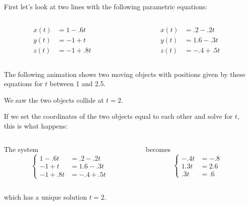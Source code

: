 \documentclass[aspectratio=169]{beamer}
\begin{document}
\begin{frame}
    First let's look at two lines with the following parametric equations:
    \vspace{1.5\baselineskip}
    \begin{columns}
        \begin{column}{0.5\textwidth}
            \[\begin{aligned}
                    x(t) &= 1 - .6t\\
                    y(t) &= -1 + t\\
                    z(t) &= -1 + .8t
                \end{aligned}\]
        \end{column}%
        \begin{column}{0.5\textwidth}
            \[\begin{aligned}
                    x(t) &= .2 - .2t\\
                    y(t) &= 1.6 - .3t\\
                    z(t) &= -.4 + .5t
                \end{aligned}\]
        \end{column}
    \end{columns}
    \pause
    \vspace{1.5\baselineskip}
    The following animation shows two moving objects with positions given by
    these equations for $t$ between 1 and 2.5.
\end{frame}
\begin{frame}
    We saw the two objects collide at $t=2$.\pause

    If we set the coordinates of the two objects equal to each other and solve
    for $t$, this is what happens:\pause

    \begin{columns}
        \begin{column}{.5\textwidth}
            The system
            \[
                \left\{
                    \begin{aligned}
                        1 - .6t &= .2 - .2t\\
                        -1 + t &= 1.6 - .3t\\
                        -1 + .8t &= -.4 + .5t
                    \end{aligned}
                \right.
            \]
        \end{column}\pause%
        \begin{column}{.5\textwidth}
            becomes
            \[
                \left\{
                    \begin{aligned}
                        -.4t &= -.8\\
                        1.3t &= 2.6\\
                        .3t &= .6
                    \end{aligned}
                \right.
            \]
        \end{column}
    \end{columns}\pause
    \vspace{1.5\baselineskip}
    which has a unique solution $t=2$.
\end{frame}
\end{document}
